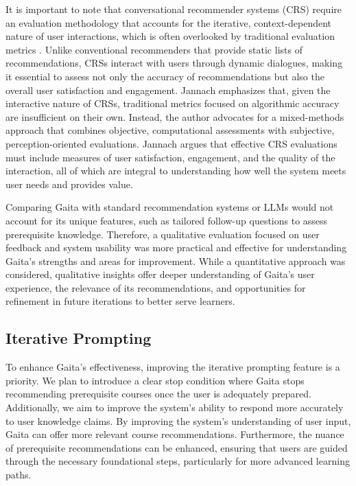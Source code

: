 It is important to note that conversational recommender systems (CRS) require an evaluation methodology that accounts for the iterative, context-dependent nature of user interactions, which is often overlooked by traditional evaluation metrics \cite{jannach_evaluating_2023}. Unlike conventional recommenders that provide static lists of recommendations, CRSs interact with users through dynamic dialogues, making it essential to assess not only the accuracy of recommendations but also the overall user satisfaction and engagement. Jannach emphasizes that, given the interactive nature of CRSs, traditional metrics focused on algorithmic accuracy are insufficient on their own. Instead, the author advocates for a mixed-methods approach that combines objective, computational assessments with subjective, perception-oriented evaluations. Jannach argues that effective CRS evaluations must include measures of user satisfaction, engagement, and the quality of the interaction, all of which are integral to understanding how well the system meets user needs and provides value.

Comparing Gaita with standard recommendation systems or LLMs would not account for its unique features, such as tailored follow-up questions to assess prerequisite knowledge. Therefore, a qualitative evaluation focused on user feedback and system usability was more practical and effective for understanding Gaita’s strengths and areas for improvement. While a quantitative approach was considered, qualitative insights offer deeper understanding of Gaita’s user experience, the relevance of its recommendations, and opportunities for refinement in future iterations to better serve learners.

\subsection{Iterative Prompting}

To enhance Gaita’s effectiveness, improving the iterative prompting feature is a priority. We plan to introduce a clear stop condition where Gaita stops recommending prerequisite courses once the user is adequately prepared. Additionally, we aim to improve the system’s ability to respond more accurately to user knowledge claims. By improving the system’s understanding of user input, Gaita can offer more relevant course recommendations. Furthermore, the nuance of prerequisite recommendations can be enhanced, ensuring that users are guided through the necessary foundational steps, particularly for more advanced learning paths. 


